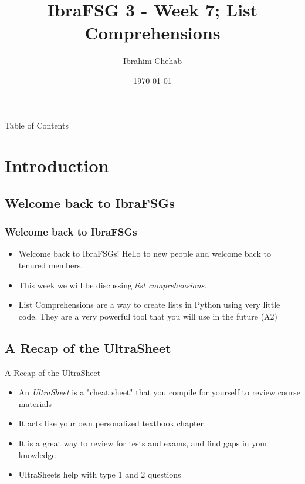 \documentclass[hyperref={colorlinks,citecolor=blue,linkcolor=blue,urlcolor=blue}]{beamer}
\title[IbraFSG 3: List Comprehensions]{IbraFSG\texttrademark{} 3 - Week 7; List Comprehensions}
\author{Ibrahim Chehab}
\institute{UTM RGASC}
\date{\today}
\begin{document}
\begin{frame}
  \titlepage
\end{frame}

\begin{frame}{Table of Contents}
  \tableofcontents
\end{frame}

\section{Introduction}

\subsection{Welcome back to IbraFSGs\texttrademark{}}
\begin{frame}
  \frametitle{Welcome back to IbraFSGs\texttrademark{}}
  \begin{itemize}
  \item Welcome back to IbraFSGs\texttrademark{}! Hello to new people and welcome back to tenured members.
  \item This week we will be discussing \textit{list comprehensions}.
  \item List Comprehensions are a way to create lists in Python using very little code. They are a very powerful tool that you will use in the future (A2)
\end{itemize}

\end{frame}

\subsection{A Recap of the UltraSheet\texttrademark{}}
\begin{frame}{A Recap of the UltraSheet\texttrademark{}}
  \begin{itemize}
    \item An \textit<overlay specification>{UltraSheet\texttrademark{}} is a "cheat sheet" that you compile for yourself to review course materials 
    \item It acts like your own personalized textbook chapter
    \item It is a great way to review for tests and exams, and find gaps in your knowledge
    \item UltraSheets\texttrademark{} help with type 1 and 2 questions 
  \end{itemize}


\end{frame}
\end{document}
